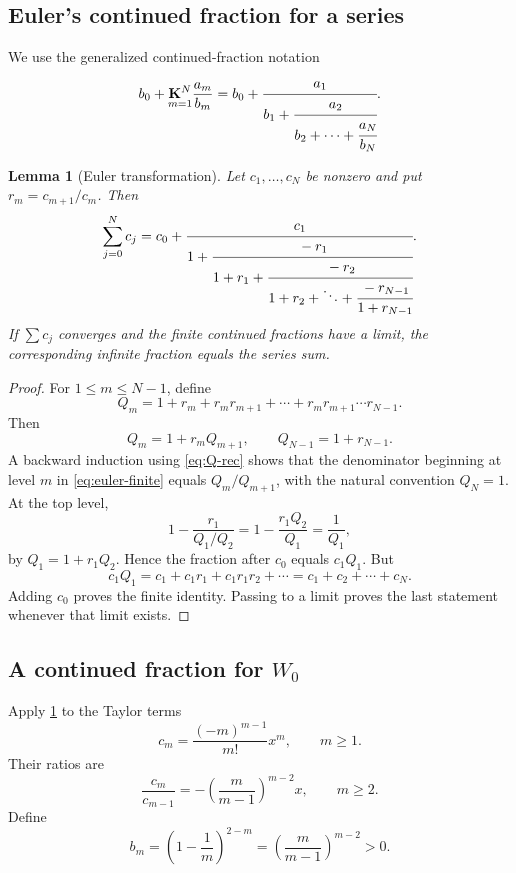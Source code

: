 \documentclass[11pt]{article}
\numberwithin{equation}{section}
\newtheorem{lemma}[theorem]{Lemma}
\theoremstyle{definition}
\theoremstyle{remark}
\begin{document}
\subsection{Euler's continued fraction for a series}

We use the generalized continued-fraction notation
\[
 b_0+\underset{m=1}{\mathbf K^N}\frac{a_m}{b_m}
 =b_0+\cfrac{a_1}{b_1+\cfrac{a_2}{b_2+\cdots+
                 \cfrac{a_N}{b_N}}}.
\]

\begin{lemma}[Euler transformation]
\label{lem:euler-fraction}
Let $c_1,\ldots,c_N$ be nonzero and put $r_m=c_{m+1}/c_m$.  Then
\begin{equation}
 \sum_{j=0}^{N}c_j
 =c_0+\cfrac{c_1}{1+
   \cfrac{-r_1}{1+r_1+
   \cfrac{-r_2}{1+r_2+\ddots+
   \cfrac{-r_{N-1}}{1+r_{N-1}}}}}.                   \label{eq:euler-finite}
\end{equation}
If $\sum c_j$ converges and the finite continued fractions have a limit, the
corresponding infinite fraction equals the series sum.
\end{lemma}

\begin{proof}
For $1\le m\le N-1$, define
\[
 Q_m=1+r_m+r_mr_{m+1}+\cdots+r_mr_{m+1}\cdots r_{N-1}.
\]
Then
\begin{equation}
 Q_m=1+r_m Q_{m+1},\qquad Q_{N-1}=1+r_{N-1}.           \label{eq:Q-rec}
\end{equation}
A backward induction using \eqref{eq:Q-rec} shows that the denominator
beginning at level $m$ in \eqref{eq:euler-finite} equals $Q_m/Q_{m+1}$, with
the natural convention $Q_N=1$.  At the top level,
\[
 1-\frac{r_1}{Q_1/Q_2}
 =1-\frac{r_1Q_2}{Q_1}
 =\frac1{Q_1},
\]
by $Q_1=1+r_1Q_2$.  Hence the fraction after $c_0$ equals
$c_1Q_1$.  But
\[
 c_1Q_1=c_1+c_1r_1+c_1r_1r_2+\cdots
       =c_1+c_2+\cdots+c_N.
\]
Adding $c_0$ proves the finite identity.  Passing to a limit proves the last
statement whenever that limit exists.
\end{proof}

\subsection{A continued fraction for \texorpdfstring{$W_0$}{W0}}

Apply \cref{lem:euler-fraction} to the Taylor terms
\[
 c_m=\frac{(-m)^{m-1}}{m!}x^m,
 \qquad m\ge1.
\]
Their ratios are
\begin{equation}
 \frac{c_m}{c_{m-1}}
 =-\left(\frac{m}{m-1}\right)^{m-2}x,
 \qquad m\ge2.                                        \label{eq:W-term-ratio}
\end{equation}
Define
\begin{equation}
 b_m=\left(1-\frac1m\right)^{2-m}
     =\left(\frac{m}{m-1}\right)^{m-2}>0.             \label{eq:b-m-cf}
\end{equation}
\end{document}
